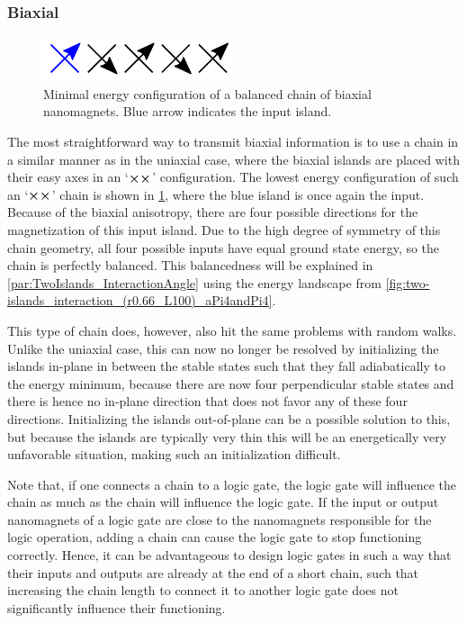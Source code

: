 \documentclass[11pt,a4paper,english,twoside]{article}
\begin{document}
\subsubsection{Biaxial}
\begin{figure}
    \centering
    \includegraphics[width=0.5\columnwidth]{Figures/Introduction/Biaxial_chain.pdf}
    \caption{Minimal energy configuration of a balanced chain of biaxial nanomagnets. Blue arrow indicates the input island.}
    \label{fig:Intro_IslandBiaxialChainGeometry}
\end{figure}
The most straightforward way to transmit biaxial information is to use a chain in a similar manner as in the uniaxial case, where the biaxial islands are placed with their easy axes in an `$\cross \cross$' configuration. The lowest energy configuration of such an `$\cross \cross$' chain is shown in \cref{fig:Intro_IslandBiaxialChainGeometry}, where the blue island is once again the input. Because of the biaxial anisotropy, there are four possible directions for the magnetization of this input island. Due to the high degree of symmetry of this chain geometry, all four possible inputs have equal ground state energy, so the chain is perfectly balanced. This balancedness will be explained in \cref{par:TwoIslands_InteractionAngle} using the energy landscape from \cref{fig:two-islands_interaction_(r0.66_L100)_aPi4andPi4}. \par
This type of chain does, however, also hit the same problems with random walks. Unlike the uniaxial case, this can now no longer be resolved by initializing the islands in-plane in between the stable states such that they fall adiabatically to the energy minimum, because there are now four perpendicular stable states and there is hence no in-plane direction that does not favor any of these four directions. Initializing the islands out-of-plane can be a possible solution to this, but because the islands are typically very thin this will be an energetically very unfavorable situation, making such an initialization difficult. \par
Note that, if one connects a chain to a logic gate, the logic gate will influence the chain as much as the chain will influence the logic gate. If the input or output nanomagnets of a logic gate are close to the nanomagnets responsible for the logic operation, adding a chain can cause the logic gate to stop functioning correctly. Hence, it can be advantageous to design logic gates in such a way that their inputs and outputs are already at the end of a short chain, such that increasing the chain length to connect it to another logic gate does not significantly influence their functioning.
\end{document}
